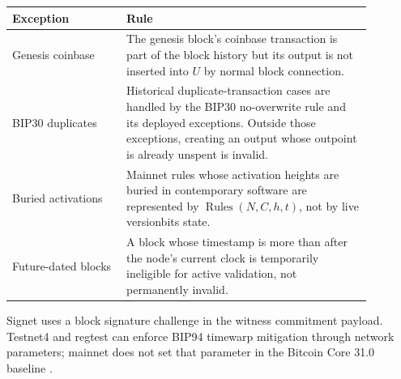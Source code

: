 \begin{longtable}{@{}L{0.28\linewidth}L{0.60\linewidth}@{}}
\toprule
Exception & Rule \\
\midrule
Genesis coinbase & The genesis block's coinbase transaction is part of the block history but its output is not inserted into \(U\) by normal block connection. \\
BIP30 duplicates & Historical duplicate-transaction cases are handled by the BIP30 no-overwrite rule and its deployed exceptions. Outside those exceptions, creating an output whose outpoint is already unspent is invalid. \\
Buried activations & Mainnet rules whose activation heights are buried in contemporary software are represented by \(\operatorname{Rules}(N,C,h,t)\), not by live versionbits state. \\
Future-dated blocks & A block whose timestamp is more than  after the node's current clock is temporarily ineligible for active validation, not permanently invalid. \\
\bottomrule
\end{longtable}

Signet uses a block signature challenge in the witness commitment payload.
Testnet4 and regtest can enforce BIP94 timewarp mitigation through network
parameters; mainnet does not set that parameter in the Bitcoin Core 31.0
baseline \cite{bip-0030,bip-0034,bip-0094,bip-0325,bitcoin-core-v31}.
